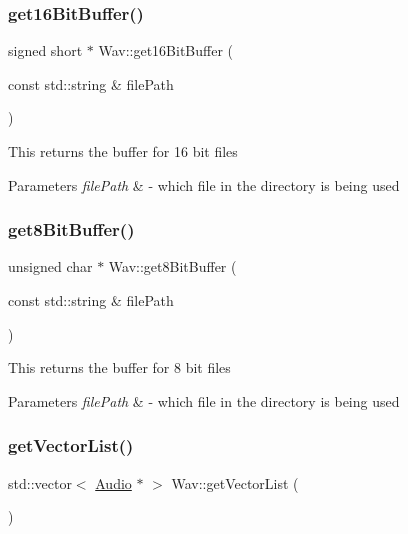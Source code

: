 \subsubsection{\texorpdfstring{get16\+Bit\+Buffer()}{get16BitBuffer()}}
{\footnotesize\ttfamily signed short $\ast$ Wav\+::get16\+Bit\+Buffer (\begin{DoxyParamCaption}\item[{const std\+::string \&}]{file\+Path }\end{DoxyParamCaption})}

This returns the buffer for 16 bit files 
\begin{DoxyParams}{Parameters}
{\em file\+Path} & -\/ which file in the directory is being used \\
\hline
\end{DoxyParams}
\mbox{\label{classWav_a071344357789033b5afffbbbfbb5581b}} 
\subsubsection{\texorpdfstring{get8\+Bit\+Buffer()}{get8BitBuffer()}}
{\footnotesize\ttfamily unsigned char $\ast$ Wav\+::get8\+Bit\+Buffer (\begin{DoxyParamCaption}\item[{const std\+::string \&}]{file\+Path }\end{DoxyParamCaption})}

This returns the buffer for 8 bit files 
\begin{DoxyParams}{Parameters}
{\em file\+Path} & -\/ which file in the directory is being used \\
\hline
\end{DoxyParams}
\mbox{\label{classWav_a68f79590f248a0db8f191f9e8d2d6672}} 
\subsubsection{\texorpdfstring{get\+Vector\+List()}{getVectorList()}}
{\footnotesize\ttfamily std\+::vector$<$ \hyperlink{classAudio}{Audio} $\ast$ $>$ Wav\+::get\+Vector\+List (\begin{DoxyParamCaption}{ }\end{DoxyParamCaption})}

